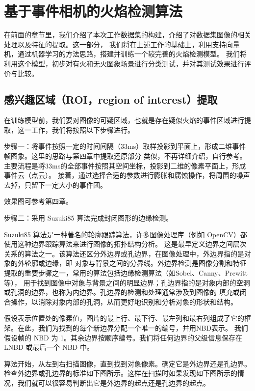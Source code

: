 
\chapter{基于事件相机的火焰检测算法}
在前面的章节里，我们介绍了本次工作数据集的构建，介绍了对数据集图像的相关处理以及特征的提取。这一部分，
我们将在上述工作的基础上，利用支持向量机，通过机器学习的方法思路，搭建并训练一个较完善的火焰检测模型。
我们将利用这个模型，初步对有火和无火图象场景进行分类测试，并对其测试效果进行评价与比较。

\section{感兴趣区域（ROI，region of interest）提取}
在训练模型前，我们要对图像的可疑区域，也就是存在疑似火焰的事件区域进行提取，这一工作，我们将按照以下步骤进行。

步骤一：将事件按照一定的时间间隔（33ms）取样投影到平面上，形成二维事件帧图象。这里的思路与第四章中提取还原部分
类似，不再详细介绍，自行参考。主要流程是将33ms的全部事件按照其空间坐标，投影到二维的像素平面上，形成事件云（点云）。
接着，通过选择合适的参数进行膨胀和腐蚀操作，将周围的噪声去掉，只留下一定大小的事件团。

效果图可参考第四章。

步骤二：采用 Suzuki85 算法完成封闭图形的边缘检测。

Suzuki85 算法是一种著名的轮廓跟踪算法，许多图像处理库（例如 OpenCV）都使用这种边界跟踪算法来进行图像的拓扑结构分析。
这是最早定义边界之间层次关系的算法之一。该算法还区分外边界或孔边界，在图像处理中，外边界指的是对象的外轮廓或边缘，即
对象与背景之间的分界线。外边界检测是图像分割和特征提取的重要步骤之一，常用的算法包括边缘检测算法（如Sobel、Canny、Prewitt等），
用于找到图像中对象与背景之间的明显边界；孔边界指的是对象内部的空洞或孔洞的边界，也称为内边界。孔边界的检测和处理通常涉及到图像的
填充或闭合操作，以消除对象内部的孔洞，从而更好地识别和分析对象的形状和结构。

假设表示位置处的像素值，图片的最上行、最下行、最左列和最右列组成了它的框架。在此，我们为找到的每个新边界分配一个唯一的编号，并用NBD表示。
我们假设帧的 NBD 为 1。其余边界按顺序编号。我们将任何边界的父级信息保存在 LNBD 或最后一个 NBD 中。

算法开始，从左到右扫描图像，直到找到对象像素。确定它是外边界还是孔边界。检查外边界或孔边界的标准如下图所示。这样在扫描时如果发现如下图所示的情况，我们就可以很容易判断出它是外边界的起点还是孔边界的起点。

